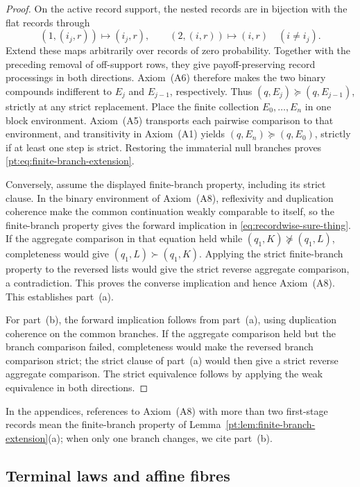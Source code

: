 \documentclass[11pt,a4paper]{article}
\theoremstyle{definition}
\newcommand{\1}{\mathbf 1}
\begin{document}
\begin{proof}
On the active record support, the nested records are in bijection with the
flat records through
\[
 (1,(i_j,r))\longmapsto(i_j,r),
 \qquad
 (2,(i,r))\longmapsto(i,r)\quad(i\ne i_j).
\]
Extend these maps arbitrarily over records of zero probability.  Together
with the preceding removal of off-support rows, they give payoff-preserving
record processings in both directions.  Axiom~\textup{(A6)} therefore
makes the two binary compounds indifferent to $E_j$ and $E_{j-1}$, respectively.  Thus
$(q,E_j)\succeq(q,E_{j-1})$, strictly at any strict replacement.  Place the finite collection
$E_0,\ldots,E_n$ in one block environment.  Axiom~\textup{(A5)} transports each pairwise comparison to that
environment, and transitivity in Axiom~\textup{(A1)} yields $(q,E_n)\succeq(q,E_0)$, strictly if at least one
step is strict.  Restoring the immaterial null branches proves \eqref{pt:eq:finite-branch-extension}.

Conversely, assume the displayed finite-branch property, including its strict clause.  In the binary environment
of Axiom~\textup{(A8)}, reflexivity and duplication coherence make the common continuation weakly comparable to
itself, so the finite-branch property gives the forward implication in
\eqref{eq:recordwise-sure-thing}.  If the aggregate comparison in that equation held while
$(q_1,K)\not\succeq(q_1,L)$, completeness would give $(q_1,L)\succ(q_1,K)$.  Applying the strict
finite-branch property to the reversed lists would give the strict reverse aggregate comparison, a contradiction.  This
proves the converse implication and hence Axiom~\textup{(A8)}.  This
establishes part~\textup{(a)}.

For part~\textup{(b)}, the forward implication follows from part~\textup{(a)}, using duplication coherence on
the common branches.  If the aggregate comparison held but the branch comparison failed, completeness would make
the reversed branch comparison strict; the strict clause of part~\textup{(a)} would then give a strict
reverse aggregate comparison.  The strict equivalence follows by applying the weak equivalence in both directions.
\end{proof}

In the appendices, references to Axiom~\textup{(A8)} with more than two first-stage records mean the
finite-branch property of Lemma~\ref{pt:lem:finite-branch-extension}\textup{(a)}; when only one branch
changes, we cite part~\textup{(b)}.

\subsection{Terminal laws and affine fibres}
\end{document}

